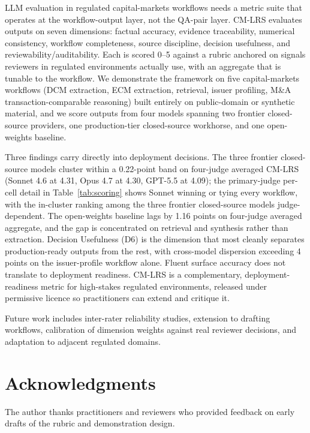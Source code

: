\documentclass[11pt]{article}
\begin{document}
LLM evaluation in regulated capital-markets workflows needs a metric suite that operates at the workflow-output layer, not the QA-pair layer. CM-LRS evaluates outputs on seven dimensions: factual accuracy, evidence traceability, numerical consistency, workflow completeness, source discipline, decision usefulness, and reviewability/auditability. Each is scored 0--5 against a rubric anchored on signals reviewers in regulated environments actually use, with an aggregate that is tunable to the workflow. We demonstrate the framework on five capital-markets workflows (DCM extraction, ECM extraction, retrieval, issuer profiling, M\&A transaction-comparable reasoning) built entirely on public-domain or synthetic material, and we score outputs from four models spanning two frontier closed-source providers, one production-tier closed-source workhorse, and one open-weights baseline.

Three findings carry directly into deployment decisions. The three frontier closed-source models cluster within a 0.22-point band on four-judge averaged CM-LRS (Sonnet 4.6 at 4.31, Opus 4.7 at 4.30, GPT-5.5 at 4.09); the primary-judge per-cell detail in Table~\ref{tab:scoring} shows Sonnet winning or tying every workflow, with the in-cluster ranking among the three frontier closed-source models judge-dependent. The open-weights baseline lags by 1.16 points on four-judge averaged aggregate, and the gap is concentrated on retrieval and synthesis rather than extraction. Decision Usefulness (D6) is the dimension that most cleanly separates production-ready outputs from the rest, with cross-model dispersion exceeding 4 points on the issuer-profile workflow alone. Fluent surface accuracy does not translate to deployment readiness. CM-LRS is a complementary, deployment-readiness metric for high-stakes regulated environments, released under permissive licence so practitioners can extend and critique it.

Future work includes inter-rater reliability studies, extension to drafting workflows, calibration of dimension weights against real reviewer decisions, and adaptation to adjacent regulated domains.

\section*{Acknowledgments}
The author thanks practitioners and reviewers who provided feedback on early drafts of the rubric and demonstration design.
\end{document}
